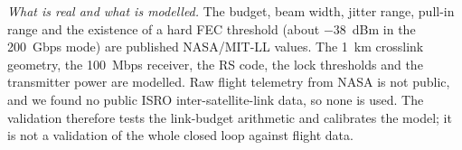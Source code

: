 \emph{What is real and what is modelled.} The budget, beam width, jitter range, pull-in range and the existence of a hard FEC threshold (about $-38$~dBm in the 200~Gbps mode) are published NASA/MIT-LL values. The 1~km crosslink geometry, the 100~Mbps receiver, the RS code, the lock thresholds and the transmitter power are modelled. Raw flight telemetry from NASA is not public, and we found no public ISRO inter-satellite-link data, so none is used. The validation therefore tests the link-budget arithmetic and calibrates the model; it is not a validation of the whole closed loop against flight data.

